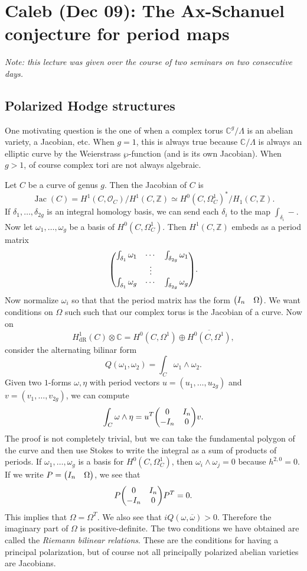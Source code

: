 \documentclass[leqno, openany]{memoir}
\theoremstyle{definition}
\theoremstyle{remark}
\theoremstyle{plain}
\theoremstyle{definition}
\theoremstyle{remark}
\newcommand{\C}{\mathbb{C}}
\newcommand{\Z}{\mathbb{Z}}
\newcommand{\mc}[1]{\mathcal{#1}}
\newcommand{\mr}[1]{\mathrm{#1}}
\newcommand{\on}[1]{\operatorname{#1}}
\newcommand{\ol}[1]{\overline{#1}}
\begin{document}
\chapter{Caleb (Dec 09): The Ax-Schanuel conjecture for period maps}%
\label{cha:the_ax_schanuel_conjecture_for_period_maps}

\textit{Note: this lecture was given over the course of two seminars on two consecutive days.} 

\section{Polarized Hodge structures}%
\label{sec:polarized_hodge_structures}

One motivating question is the one of when a complex torus $\C^g / \Lambda$ is an abelian variety, a Jacobian, etc. When $g = 1$, this is always true because $\C/\Lambda$ is always an elliptic curve by the Weierstrass $\wp$-function (and is its own Jacobian). When $g > 1$, of course complex tori are not always algebraic.

Let $C$ be a curve of genus $g$. Then the Jacobian of $C$ is 
\[ \on{Jac}(C) = H^1(C, \mc{O}_C) / H^1(C, \Z) \simeq H^0(C, \Omega^1_C)^* / H_1(C, \Z). \]
If $\delta_1, \ldots, \delta_{2g}$ is an integral homology basis, we can send each $\delta_i$ to the map $\int_{\delta_i} -$. Now let $\omega_1, \ldots, \omega_g$ be a basis of $H^0(C, \Omega^1_C)$. Then $H^1(C, \Z)$ embeds as a period matrix
\[ \mqty(\int_{\delta_1} \omega_1 & \cdots & \int_{\delta_{2g}} \omega_1 \\
& \vdots & \\
\int_{\delta_1} \omega_g & \cdots & \int_{\delta_{2g}} \omega_g). \]
Now normalize $\omega_i$ so that that the period matrix has the form $\mqty(I_n & \Omega)$. We want conditions on $\Omega$ such such that our complex torus is the Jacobian of a curve. Now on
\[ H^1_{\mr{dR}}(C) \otimes \C = H^0(C, \Omega^1) \oplus \ol{H^0(C, \Omega^1)}, \]
consider the alternating bilinar form
\[ Q(\omega_1, \omega_2) = \int_C \omega_1 \wedge \omega_2. \]
Given two $1$-forms $\omega, \eta$ with period vectors $u = (u_1, \ldots, u_{2g})$ and $v = (v_1, \ldots, v_{2g})$, we can compute
\[ \int_C \omega \wedge \eta = u^T \mqty(0 & I_n \\ -I_n & 0) v. \]
The proof is not completely trivial, but we can take the fundamental polygon of the curve and then use Stokes to write the integral as a sum of products of periods. If $\omega_1, \ldots, \omega_g$ is a basis for $H^0(C, \Omega^1_C)$, then $\omega_i \wedge \omega_j = 0$ because $h^{2,0} = 0$. If we write $P = \mqty(I_n & \Omega)$, we see that
\[ P \mqty(0 & I_n \\ -I_n & 0) P^T = 0. \]
This implies that $\Omega = \Omega^T$. We also see that $i Q(\omega, \ol{\omega}) > 0$. Therefore the imaginary part of $\Omega$ is positive-definite. The two conditions we have obtained are called the \textit{Riemann bilinear relations}. These are the conditions for having a principal polarization, but of course not all principally polarized abelian varieties are Jacobians.
\end{document}
